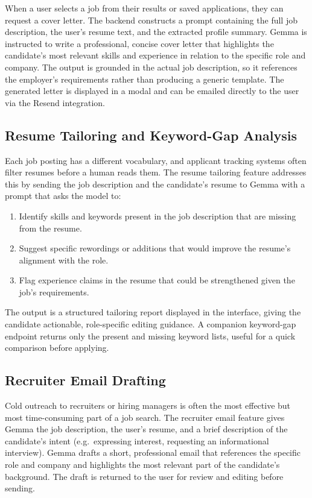 \documentclass[11pt]{article}
\begin{document}
When a user selects a job from their results or saved applications, they can request a cover letter. The backend constructs a prompt containing the full job description, the user's resume text, and the extracted profile summary. Gemma is instructed to write a professional, concise cover letter that highlights the candidate's most relevant skills and experience in relation to the specific role and company. The output is grounded in the actual job description, so it references the employer's requirements rather than producing a generic template. The generated letter is displayed in a modal and can be emailed directly to the user via the Resend integration.

\subsection{Resume Tailoring and Keyword-Gap Analysis}

Each job posting has a different vocabulary, and applicant tracking systems often filter resumes before a human reads them. The resume tailoring feature addresses this by sending the job description and the candidate's resume to Gemma with a prompt that asks the model to:

\begin{enumerate}
  \item Identify skills and keywords present in the job description that are missing from the resume.
  \item Suggest specific rewordings or additions that would improve the resume's alignment with the role.
  \item Flag experience claims in the resume that could be strengthened given the job's requirements.
\end{enumerate}

The output is a structured tailoring report displayed in the interface, giving the candidate actionable, role-specific editing guidance. A companion keyword-gap endpoint returns only the present and missing keyword lists, useful for a quick comparison before applying.

\subsection{Recruiter Email Drafting}

Cold outreach to recruiters or hiring managers is often the most effective but most time-consuming part of a job search. The recruiter email feature gives Gemma the job description, the user's resume, and a brief description of the candidate's intent (e.g.\ expressing interest, requesting an informational interview). Gemma drafts a short, professional email that references the specific role and company and highlights the most relevant part of the candidate's background. The draft is returned to the user for review and editing before sending.
\end{document}
